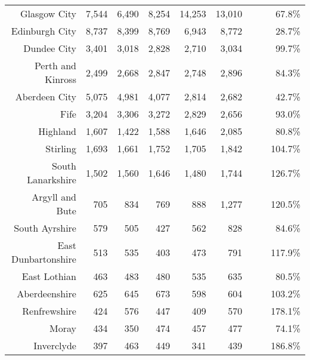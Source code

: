 \documentclass[
  12pt,
]{article}
\begin{document}
\begin{longtable}[t]{rrrrrrrrr}
\endfoot
\bottomrule
\endlastfoot
Glasgow City & 7,544 & 6,490 & 8,254 & 14,253 & 13,010 & \cellcolor{white}{ -8.7\%} & \cellcolor{white}{ 14.6\%} & 67.8\%\\
Edinburgh City & 8,737 & 8,399 & 8,769 & 6,943 & 8,772 & \cellcolor{white}{ 26.3\%} & \cellcolor{white}{  0.1\%} & 28.7\%\\
Dundee City & 3,401 & 3,018 & 2,828 & 2,710 & 3,034 & \cellcolor{white}{ 12.0\%} & \cellcolor{white}{ -2.8\%} & 99.7\%\\
Perth and Kinross & 2,499 & 2,668 & 2,847 & 2,748 & 2,896 & \cellcolor{white}{  5.4\%} & \cellcolor{white}{  3.8\%} & 84.3\%\\
Aberdeen City & 5,075 & 4,981 & 4,077 & 2,814 & 2,682 & \cellcolor{white}{ -4.7\%} & \cellcolor{white}{-14.7\%} & 42.7\%\\
Fife & 3,204 & 3,306 & 3,272 & 2,829 & 2,656 & \cellcolor{white}{ -6.1\%} & \cellcolor{white}{ -4.6\%} & 93.0\%\\
Highland & 1,607 & 1,422 & 1,588 & 1,646 & 2,085 & \cellcolor{white}{ 26.7\%} & \cellcolor{white}{  6.7\%} & 80.8\%\\
Stirling & 1,693 & 1,661 & 1,752 & 1,705 & 1,842 & \cellcolor{white}{  8.0\%} & \cellcolor{white}{  2.1\%} & 104.7\%\\
South Lanarkshire & 1,502 & 1,560 & 1,646 & 1,480 & 1,744 & \cellcolor{white}{ 17.8\%} & \cellcolor{white}{  3.8\%} & 126.7\%\\
Argyll and Bute & 705 & 834 & 769 & 888 & 1,277 & \cellcolor{white}{ 43.8\%} & \cellcolor{white}{ 16.0\%} & 120.5\%\\
South Ayrshire & 579 & 505 & 427 & 562 & 828 & \cellcolor{white}{ 47.3\%} & \cellcolor{white}{  9.4\%} & 84.6\%\\
East Dunbartonshire & 513 & 535 & 403 & 473 & 791 & \cellcolor{white}{ 67.2\%} & \cellcolor{white}{ 11.4\%} & 117.9\%\\
East Lothian & 463 & 483 & 480 & 535 & 635 & \cellcolor{white}{ 18.7\%} & \cellcolor{white}{  8.2\%} & 80.5\%\\
Aberdeenshire & 625 & 645 & 673 & 598 & 604 & \cellcolor{white}{  1.0\%} & \cellcolor{white}{ -0.9\%} & 103.2\%\\
Renfrewshire & 424 & 576 & 447 & 409 & 570 & \cellcolor{white}{ 39.4\%} & \cellcolor{white}{  7.7\%} & 178.1\%\\
Moray & 434 & 350 & 474 & 457 & 477 & \cellcolor{white}{  4.4\%} & \cellcolor{white}{  2.4\%} & 74.1\%\\
Inverclyde & 397 & 463 & 449 & 341 & 439 & \cellcolor{white}{ 28.7\%} & \cellcolor{white}{  2.5\%} & 186.8\%\\

\end{longtable}
\end{document}
